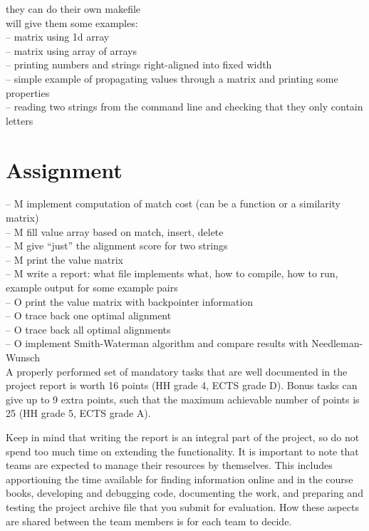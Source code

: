 \documentclass[a4paper,10pt]{article}
\begin{document}
they can do their own makefile\\
will give them some examples:\\
-- matrix using 1d array\\
-- matrix using array of arrays\\
-- printing numbers and strings right-aligned into fixed width\\
-- simple example of propagating values through a matrix and printing some properties\\
-- reading two strings from the command line and checking that they only contain letters\\



\section{Assignment}

-- M implement computation of match cost (can be a function or a similarity matrix)\\
-- M fill value array based on match, insert, delete\\
-- M give ``just'' the alignment score for two strings\\
-- M print the value matrix\\
-- M write a report: what file implements what, how to compile, how to run, example output for some example pairs\\
-- O print the value matrix with backpointer information\\
-- O trace back one optimal alignment\\
-- O trace back all optimal alignments\\
-- O implement Smith-Waterman algorithm and compare results with Needleman-Wunsch\\

A properly performed set of mandatory tasks that are well documented in the project report is worth 16 points (HH grade 4, ECTS grade D).
Bonus tasks can give up to 9 extra points, such that the maximum achievable number of points is 25 (HH grade 5, ECTS grade A).

Keep in mind that writing the report is an integral part of the project, so do not spend too much time on extending the functionality.
It is important to note that teams are expected to manage their resources by themselves.
This includes apportioning the time available for finding information online and in the course books, developing and debugging code, documenting the work, and preparing and testing the project archive file that you submit for evaluation.
How these aspects are shared between the team members is for each team to decide.
\end{document}

